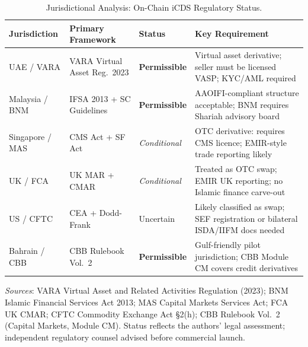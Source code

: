 \begin{table}[htbp]
\centering
\caption{Jurisdictional Analysis: On-Chain iCDS Regulatory Status.}
\label{tab:juris}
\small
\begin{tabular}{llll}
\toprule
Jurisdiction & Primary Framework & Status & Key Requirement \\
\midrule
UAE / VARA & VARA Virtual Asset Reg.\ 2023 & \textcolor{green!50!black}{\textbf{Permissible}} & \small Virtual asset derivative; seller must be licensed VASP; KYC/AML required \\
Malaysia / BNM & IFSA 2013 + SC Guidelines & \textcolor{green!50!black}{\textbf{Permissible}} & \small AAOIFI-compliant structure acceptable; BNM requires Shariah advisory board \\
Singapore / MAS & CMS Act + SF Act & \textcolor{orange!80!black}{\textit{Conditional}} & \small OTC derivative: requires CMS licence; EMIR-style trade reporting likely \\
UK / FCA & UK MAR + CMAR & \textcolor{orange!80!black}{\textit{Conditional}} & \small Treated as OTC swap; EMIR UK reporting; no Islamic finance carve-out \\
US / CFTC & CEA + Dodd-Frank & \textcolor{red!70!black}{Uncertain} & \small Likely classified as swap; SEF registration or bilateral ISDA/IIFM docs needed \\
Bahrain / CBB & CBB Rulebook Vol.\ 2 & \textcolor{green!50!black}{\textbf{Permissible}} & \small Gulf-friendly pilot jurisdiction; CBB Module CM covers credit derivatives \\
\bottomrule
\end{tabular}
\begin{minipage}{\textwidth}
\smallskip\footnotesize
\textit{Sources}: VARA Virtual Asset and Related Activities Regulation (2023); BNM Islamic Financial Services Act 2013; MAS Capital Markets Services Act; FCA UK CMAR; CFTC Commodity Exchange Act \S{}2(h); CBB Rulebook Vol.\ 2 (Capital Markets, Module CM). Status reflects the authors' legal assessment; independent regulatory counsel advised before commercial launch.
\end{minipage}
\end{table}
